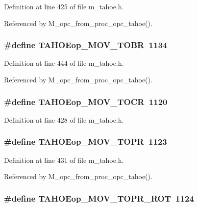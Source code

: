 Definition at line 425 of file m\_\-tahoe.h.

Referenced by M\_\-opc\_\-from\_\-proc\_\-opc\_\-tahoe().
\subsubsection{\setlength{\rightskip}{0pt plus 5cm}\#define TAHOEop\_\-MOV\_\-TOBR~1134}\label{m__tahoe_8h_78f77118c0e8b1beab0e6e8826e09284}




Definition at line 444 of file m\_\-tahoe.h.

Referenced by M\_\-opc\_\-from\_\-proc\_\-opc\_\-tahoe().
\subsubsection{\setlength{\rightskip}{0pt plus 5cm}\#define TAHOEop\_\-MOV\_\-TOCR~1120}\label{m__tahoe_8h_56667043c1764d2fbff5bf56b1db96fc}




Definition at line 428 of file m\_\-tahoe.h.
\subsubsection{\setlength{\rightskip}{0pt plus 5cm}\#define TAHOEop\_\-MOV\_\-TOPR~1123}\label{m__tahoe_8h_2496c51b87f03e4f1941a96d098964ed}




Definition at line 431 of file m\_\-tahoe.h.

Referenced by M\_\-opc\_\-from\_\-proc\_\-opc\_\-tahoe().
\subsubsection{\setlength{\rightskip}{0pt plus 5cm}\#define TAHOEop\_\-MOV\_\-TOPR\_\-ROT~1124}\label{m__tahoe_8h_c625331068d8b4adbcc9afb69e6f0535}




